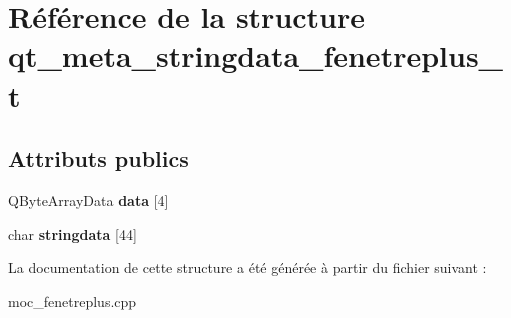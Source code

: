 \hypertarget{structqt__meta__stringdata__fenetreplus__t}{\section{Référence de la structure qt\+\_\+meta\+\_\+stringdata\+\_\+fenetreplus\+\_\+t}
\label{structqt__meta__stringdata__fenetreplus__t}
}
\subsection*{Attributs publics}
\begin{DoxyCompactItemize}
\item 
\hypertarget{structqt__meta__stringdata__fenetreplus__t_aedbfcc580cbb7ec354e17fe2ff1144e3}{Q\+Byte\+Array\+Data {\bfseries data} \mbox{[}4\mbox{]}}\label{structqt__meta__stringdata__fenetreplus__t_aedbfcc580cbb7ec354e17fe2ff1144e3}

\item 
\hypertarget{structqt__meta__stringdata__fenetreplus__t_a0c8a12da1137c90c77141f4efa671b87}{char {\bfseries stringdata} \mbox{[}44\mbox{]}}\label{structqt__meta__stringdata__fenetreplus__t_a0c8a12da1137c90c77141f4efa671b87}

\end{DoxyCompactItemize}


La documentation de cette structure a été générée à partir du fichier suivant \+:\begin{DoxyCompactItemize}
\item 
moc\+\_\+fenetreplus.\+cpp\end{DoxyCompactItemize}
